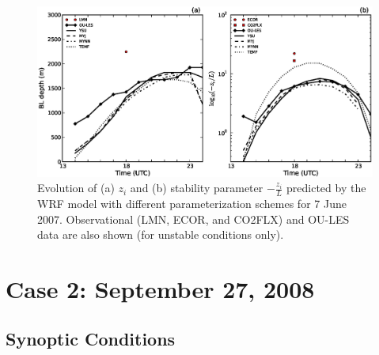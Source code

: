 \begin{figure}[ht!]
\begin{center}
\includegraphics[width=\textwidth]{figures/chapter4/pblh_phi_phys_20070607}
\end{center}
\caption{Evolution of (a) $z_i$ and (b) stability parameter $-\frac{z_i}{L}$ predicted by the WRF model with different parameterization schemes for 7 June 2007. Observational (LMN, ECOR, and CO2FLX) and OU-LES data are also shown (for unstable conditions only).}
\label{figure409}
\end{figure}


\section{Case 2: September 27, 2008}
\label{sept27-44}

\subsection{Synoptic Conditions}
\label{mc-441}


